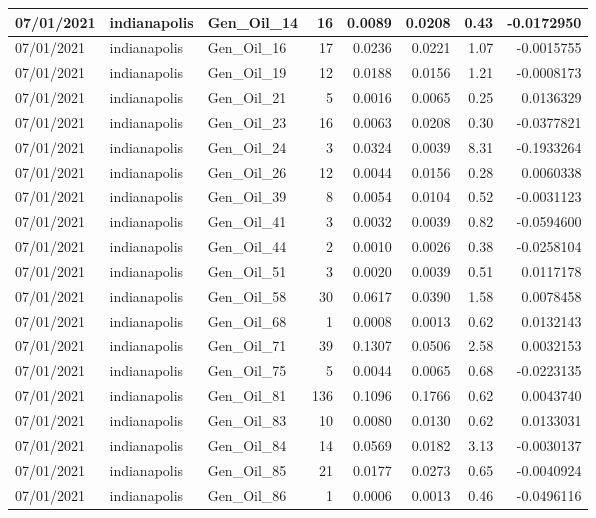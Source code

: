 \documentclass[
  letterpaper,
  DIV=11,
  numbers=noendperiod]{scrartcl}
\begin{document}
\begin{tabular}{l|l|l|r|r|r|r|r}
\hline
07/01/2021 & indianapolis & Gen\_Oil\_14 & 16 & 0.0089 & 0.0208 & 0.43 & -0.0172950\\
\hline
07/01/2021 & indianapolis & Gen\_Oil\_16 & 17 & 0.0236 & 0.0221 & 1.07 & -0.0015755\\
\hline
07/01/2021 & indianapolis & Gen\_Oil\_19 & 12 & 0.0188 & 0.0156 & 1.21 & -0.0008173\\
\hline
07/01/2021 & indianapolis & Gen\_Oil\_21 & 5 & 0.0016 & 0.0065 & 0.25 & 0.0136329\\
\hline
07/01/2021 & indianapolis & Gen\_Oil\_23 & 16 & 0.0063 & 0.0208 & 0.30 & -0.0377821\\
\hline
07/01/2021 & indianapolis & Gen\_Oil\_24 & 3 & 0.0324 & 0.0039 & 8.31 & -0.1933264\\
\hline
07/01/2021 & indianapolis & Gen\_Oil\_26 & 12 & 0.0044 & 0.0156 & 0.28 & 0.0060338\\
\hline
07/01/2021 & indianapolis & Gen\_Oil\_39 & 8 & 0.0054 & 0.0104 & 0.52 & -0.0031123\\
\hline
07/01/2021 & indianapolis & Gen\_Oil\_41 & 3 & 0.0032 & 0.0039 & 0.82 & -0.0594600\\
\hline
07/01/2021 & indianapolis & Gen\_Oil\_44 & 2 & 0.0010 & 0.0026 & 0.38 & -0.0258104\\
\hline
07/01/2021 & indianapolis & Gen\_Oil\_51 & 3 & 0.0020 & 0.0039 & 0.51 & 0.0117178\\
\hline
07/01/2021 & indianapolis & Gen\_Oil\_58 & 30 & 0.0617 & 0.0390 & 1.58 & 0.0078458\\
\hline
07/01/2021 & indianapolis & Gen\_Oil\_68 & 1 & 0.0008 & 0.0013 & 0.62 & 0.0132143\\
\hline
07/01/2021 & indianapolis & Gen\_Oil\_71 & 39 & 0.1307 & 0.0506 & 2.58 & 0.0032153\\
\hline
07/01/2021 & indianapolis & Gen\_Oil\_75 & 5 & 0.0044 & 0.0065 & 0.68 & -0.0223135\\
\hline
07/01/2021 & indianapolis & Gen\_Oil\_81 & 136 & 0.1096 & 0.1766 & 0.62 & 0.0043740\\
\hline
07/01/2021 & indianapolis & Gen\_Oil\_83 & 10 & 0.0080 & 0.0130 & 0.62 & 0.0133031\\
\hline
07/01/2021 & indianapolis & Gen\_Oil\_84 & 14 & 0.0569 & 0.0182 & 3.13 & -0.0030137\\
\hline
07/01/2021 & indianapolis & Gen\_Oil\_85 & 21 & 0.0177 & 0.0273 & 0.65 & -0.0040924\\
\hline
07/01/2021 & indianapolis & Gen\_Oil\_86 & 1 & 0.0006 & 0.0013 & 0.46 & -0.0496116\\

\end{tabular}
\end{document}
